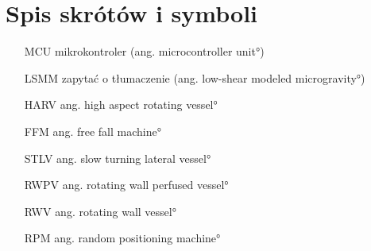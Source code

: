 \chapter*{Spis skrótów i symboli}

\begin{itemize}
	\item[MCU] mikrokontroler (ang. \ang{microcontroller unit})
	\item[LSMM] zapytać o tłumaczenie  (ang. \ang{low-shear modeled microgravity})
	\item[HARV]  {ang. \ang{high aspect rotating vessel}}
	\item[FFM]  {ang. \ang{free fall machine}}
	\item[STLV]  {ang. \ang{slow turning lateral vessel}}
	\item[RWPV]  {ang. \ang{rotating wall perfused vessel}}
	\item[RWV]  {ang. \ang{rotating wall vessel}}
	\item[RPM]  {ang. \ang{random positioning machine}}
	
\end{itemize}
